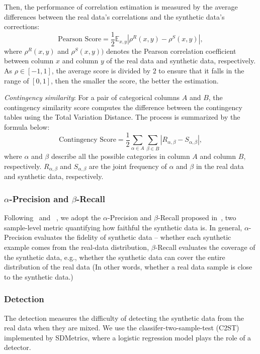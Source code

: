 Then, the performance of correlation estimation is measured by the average differences between the real data's correlations and the synthetic data's corrections:
\begin{equation}
    {\text{Pearson Score}} = \frac{1}{2} \mathbb{E}_{x,y} | \rho^{R}(x,y) - \rho^{S} (x,y)  |,
\end{equation}
where $\rho^R(x,y)$ and $ \rho^S(x,y))$ denotes the Pearson correlation coefficient between column $x$ and column $y$ of the real data and synthetic data, respectively. As $\rho \in [-1, 1]$, the average score is divided by $2$ to ensure that it falls in the range of $[0,1]$, then the smaller the score, the better the estimation.

\textit{Contingency similarity}: For a pair of categorical columns $A$ and $B$, the contingency similarity score computes the difference between the contingency tables using the Total Variation Distance. The process is summarized by the formula below:
\begin{equation}
    \text{Contingency Score} = \frac{1}{2} \sum\limits_{\alpha \in A} \sum\limits_{\beta \in B} | R_{\alpha, \beta} - S_{\alpha, \beta}|,
\end{equation}
where $\alpha$ and $\beta$ describe all the possible categories in column $A$ and column $B$, respectively. $R_{\alpha, \beta}$ and $S_{\alpha, \beta}$ are the joint frequency of $\alpha$ and $\beta$ in the real data and synthetic data, respectively.



\subsubsection{$\alpha$-Precision and $\beta$-Recall}
Following~\citet{goggle} and ~\citet{faithful}, we adopt the $\alpha$-Precision and $\beta$-Recall proposed in~\citet{faithful}, two sample-level metric quantifying how faithful the synthetic data is. In general, $\alpha$-Precision evaluates the fidelity of synthetic data -- whether each synthetic example comes from the real-data distribution, $\beta$-Recall evaluates the coverage of the synthetic data, e.g., whether the synthetic data can cover the entire distribution of the real data (In other words, whether a real data sample is close to the synthetic data.)

\subsubsection{Detection}
The detection measures the difficulty of detecting the synthetic data from the real data when they are mixed. We use the classifer-two-sample-test (C2ST) implemented by SDMetrics, where a logistic regression model plays the role of a detector.

